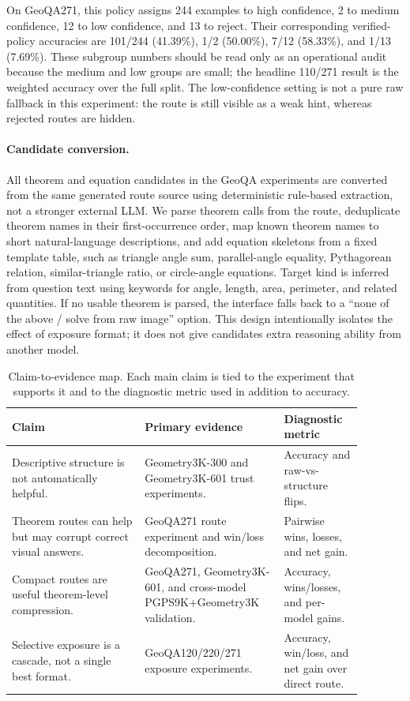 \documentclass[11pt]{article}
\begin{document}
On GeoQA271, this policy assigns 244 examples to high confidence, 2 to medium confidence, 12 to low confidence, and 13 to reject. Their corresponding verified-policy accuracies are 101/244 (41.39\%), 1/2 (50.00\%), 7/12 (58.33\%), and 1/13 (7.69\%). These subgroup numbers should be read only as an operational audit because the medium and low groups are small; the headline 110/271 result is the weighted accuracy over the full split. The low-confidence setting is not a pure raw fallback in this experiment: the route is still visible as a weak hint, whereas rejected routes are hidden.

\paragraph{Candidate conversion.}
All theorem and equation candidates in the GeoQA experiments are converted from the same generated route source using deterministic rule-based extraction, not a stronger external LLM. We parse theorem calls from the route, deduplicate theorem names in their first-occurrence order, map known theorem names to short natural-language descriptions, and add equation skeletons from a fixed template table, such as triangle angle sum, parallel-angle equality, Pythagorean relation, similar-triangle ratio, or circle-angle equations. Target kind is inferred from question text using keywords for angle, length, area, perimeter, and related quantities. If no usable theorem is parsed, the interface falls back to a ``none of the above / solve from raw image'' option. This design intentionally isolates the effect of exposure format; it does not give candidates extra reasoning ability from another model.

\begin{table}[t]
\centering
\caption{Claim-to-evidence map. Each main claim is tied to the experiment that supports it and to the diagnostic metric used in addition to accuracy.}
\label{tab:claim-evidence}
\small
\begin{tabular}{p{0.34\linewidth}p{0.34\linewidth}p{0.20\linewidth}}
\toprule
Claim & Primary evidence & Diagnostic metric \\
\midrule
Descriptive structure is not automatically helpful. & Geometry3K-300 and Geometry3K-601 trust experiments. & Accuracy and raw-vs-structure flips. \\
Theorem routes can help but may corrupt correct visual answers. & GeoQA271 route experiment and win/loss decomposition. & Pairwise wins, losses, and net gain. \\
Compact routes are useful theorem-level compression. & GeoQA271, Geometry3K-601, and cross-model PGPS9K+Geometry3K validation. & Accuracy, wins/losses, and per-model gains. \\
Selective exposure is a cascade, not a single best format. & GeoQA120/220/271 exposure experiments. & Accuracy, win/loss, and net gain over direct route. \\
\bottomrule
\end{tabular}
\end{table}
\end{document}
